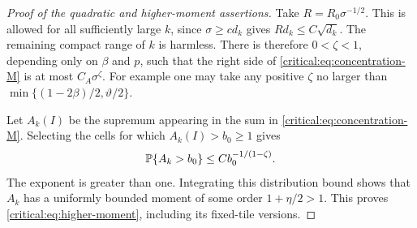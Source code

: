 \begin{proof}[Proof of the quadratic and higher-moment assertions]
Take \(R=R_0\sigma^{-1/2}\). This is allowed for all sufficiently
large \(k\), since \(\sigma\ge c d_k\) gives
\(Rd_k\le C\sqrt{d_k}\). The remaining compact range of \(k\)
is harmless. There is therefore \(0<\zeta<1\), depending only on
\(\beta\) and \(p\), such that the right side of
\eqref{critical:eq:concentration-M} is at most \(C_A\sigma^\zeta\).
For example one may take any positive \(\zeta\) no larger than
\(\min\{(1-2\beta)/2,\vartheta/2\}\).

Let \(A_k(I)\) be the supremum appearing in the sum in
\eqref{critical:eq:concentration-M}. Selecting the cells for which
\(A_k(I)>b_0\ge1\) gives
\[
 \mathbb P\{A_k>b_0\}\le C b_0^{-1/(1-\zeta)}.
\]
The exponent is greater than one. Integrating this distribution
bound shows that \(A_k\) has a uniformly bounded moment of some
order \(1+\eta/2>1\). This proves
\eqref{critical:eq:higher-moment}, including its fixed-tile versions.
\end{proof}
